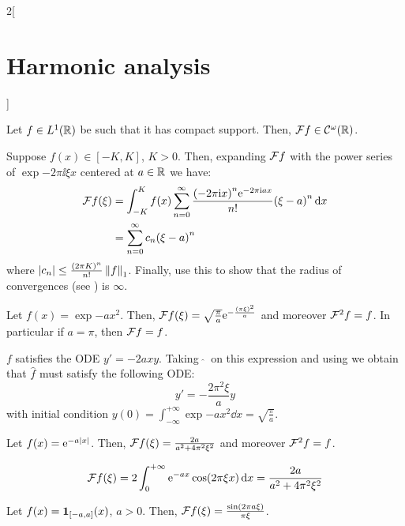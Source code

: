 \documentclass[../../../main_math.tex]{subfiles}
\begin{document}
\begin{multicols}{2}[\section{Harmonic analysis}]
  \begin{proposition}
    Let $f\in L^1(\mathbb{R})$ be such that it has compact support. Then, $\mathcal{F} f\in\mathcal{C}^\omega(\mathbb{R})$.
  \end{proposition}
  \begin{sproof}
    Suppose $f(x)\in[-K,K]$, $K>0$. Then, expanding $\mathcal{F} f$ with the power series of $\exp{-2\pi\ii\xi x}$ centered at $a\in\mathbb{R}$ we have:
    \begin{align*}
      \mathcal{F} f(\xi) & =\int_{-K}^Kf(x)\sum_{n=0}^{\infty}\frac{{(-2\pi\mathrm{i} x)}^n\mathrm{e}^{-2\pi\mathrm{i} a x}}{n!}{(\xi-a)}^n\dd{x} \\
                & =\sum_{n=0}^\infty c_n{(\xi-a)}^n
    \end{align*}
    where $\abs{c_n}\leq\frac{{(2\pi K)}^n}{n!}\left\|f\right\|_1$. Finally, use this to show that the radius of convergences (see ) is $\infty$.
  \end{sproof}
  \begin{lemma}\label{HA:expX2}
    Let $f(x)=\exp{-a x^2}$. Then, $\mathcal{F} f(\xi)=\sqrt{\frac{\pi}{a}}\mathrm{e}^{-\frac{{(\pi \xi)}^2}{a}}$ and moreover $\mathcal{F}^2f=f$. In particular if $a=\pi$, then $\mathcal{F} f=f$.
  \end{lemma}
  \begin{sproof}
    $f$ satisfies the ODE $y'=-2a x y$. Taking $\ \widehat{}\ $ on this expression and using  we obtain that $\widehat{f}$ must satisfy the following ODE:
    $$y'=-\frac{2\pi^2\xi}{a} y$$
    with initial condition $y(0)=\int_{-\infty}^{+\infty}\exp{-a x^2}\dd{x}=\sqrt{\frac{\pi}{a}}$.
  \end{sproof}
  \begin{lemma}\label{HA:expAbsX}
    Let $f(x)=\mathrm{e}^{-a\abs{x}}$. Then, $\mathcal{F} f(\xi)=\frac{2a}{a^2+4\pi^2\xi^2}$ and moreover $\mathcal{F}^2f=f$.
  \end{lemma}
  \begin{sproof}
    $$\mathcal{F} f(\xi)=2\int_0^{+\infty}\mathrm{e}^{-ax}\cos(2\pi\xi x)\dd{x}=\frac{2a}{a^2+4\pi^2\xi^2}$$
  \end{sproof}
  \begin{lemma}
    Let $f(x)=\boldsymbol{\mathrm{1}}_{[-a,a]}(x)$, $a>0$. Then, $\mathcal{F} f(\xi)=\frac{\sin(2\pi a\xi)}{\pi\xi}$.
  \end{lemma}

\end{multicols}
\end{document}
